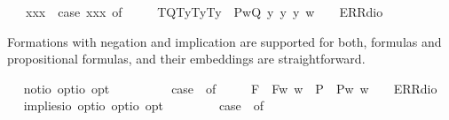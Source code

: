 \begin{isabellebody}
\ \ \ {\isachardoublequoteopen}{\isasymlparr}{\isasymPhi}{\isacharcomma}x{}{\isacharcomma}x{}{\isacharcomma}x{}{\isasymrparr}\ {\isasymequiv}\ case\ {\isacharparenleft}{\isasymPhi}{\isacharcomma}x{}{\isacharcomma}x{}{\isacharcomma}x{}{\isacharparenright}\ of\ \isanewline
\ \ \ \ {\isacharparenleft}T{\isacharparenleft}Q{\isacharparenright}{\isacharcomma}T{\isacharparenleft}y{}{\isacharparenright}{\isacharcomma}T{\isacharparenleft}y{}{\isacharparenright}{\isacharcomma}T{\isacharparenleft}y{}{\isacharparenright}{\isacharparenright}\ {\isasymRightarrow}\ P{\isacharparenleft}{\isasymlambda}w{\isachardot}{\isacharparenleft}Q\ y{}\ y{}\ y{}{\isacharparenright}\ w{\isacharparenright}\ {\isacharbar}\ {\isacharunderscore}\ {\isasymRightarrow}\ ERR{\isacharparenleft}dio{\isacharparenright}{\isachardoublequoteclose}%
\begin{isamarkuptext}%
Formations with negation and implication are supported for both, formulas  and propositional
  formulas, and their embeddings are straightforward.%
\end{isamarkuptext}%
\isamarkuptrue%
\ \isamarkupfalse%
\ not{\isacharcolon}{\isacharcolon}{\isachardoublequoteopen}io\ opt{\isasymRightarrow}io\ opt{\isachardoublequoteclose}\ \ {\isacharparenleft}{\isachardoublequoteopen}\isactrlbold {\isasymnot}\ {\isacharunderscore}{\isachardoublequoteclose}\ {\isacharbrackleft}{}{}{\isacharbrackright}\ {}{}{\isacharparenright}\ \ {\isachardoublequoteopen}\isactrlbold {\isasymnot}\ {\isasymphi}\ {\isasymequiv}\ case\ {\isasymphi}\ of\ \isanewline
\ \ \ \ F{\isacharparenleft}{\isasympsi}{\isacharparenright}\ {\isasymRightarrow}\ F{\isacharparenleft}{\isasymlambda}w{\isachardot}{\isasymnot}{\isacharparenleft}{\isasympsi}\ w{\isacharparenright}{\isacharparenright}\ {\isacharbar}\ P{\isacharparenleft}{\isasympsi}{\isacharparenright}\ {\isasymRightarrow}\ P{\isacharparenleft}{\isasymlambda}w{\isachardot}{\isasymnot}{\isacharparenleft}{\isasympsi}\ w{\isacharparenright}{\isacharparenright}\ {\isacharbar}\ {\isacharunderscore}\ {\isasymRightarrow}\ ERR{\isacharparenleft}dio{\isacharparenright}{\isachardoublequoteclose}\ \ \isanewline
\ \isamarkupfalse%
\ implies{\isacharcolon}{\isacharcolon}{\isachardoublequoteopen}io\ opt{\isasymRightarrow}io\ opt{\isasymRightarrow}io\ opt{\isachardoublequoteclose}\ {\isacharparenleft}\ {\isachardoublequoteopen}\isactrlbold {\isasymrightarrow}{\isachardoublequoteclose}\ {}{}{\isacharparenright}\ \ {\isachardoublequoteopen}{\isasymphi}\ \isactrlbold {\isasymrightarrow}\ {\isasympsi}\ {\isasymequiv}\ case\ {\isacharparenleft}{\isasymphi}{\isacharcomma}{\isasympsi}{\isacharparenright}\ of\ \isanewline

\end{isabellebody}
